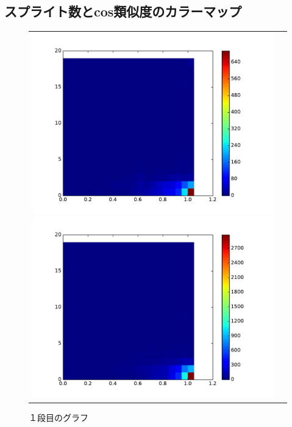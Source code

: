 \documentclass[twocolumn,9pt,a4paper]{jsarticle}
\begin{document}
\subsection{スプライト数とcos類似度のカラーマップ}

\begin{figure}[h]
 \begin{tabular}{cc}
 	\begin{minipage}[t]{0.45\hsize}
	 \centering
	 \includegraphics[keepaspectratio, scale = 0.2]{colormap_splite_1.pdf}
	 \caption{１段目のグラフ}
	 \label{first_splite}
	\end{minipage}
        \begin{minipage}[t]{0.45\hsize}
	 \centering
	 \includegraphics[keepaspectratio, scale = 0.2]{colormap_splite_2.pdf}

\end{minipage}
\end{tabular}
\end{figure}
\end{document}
